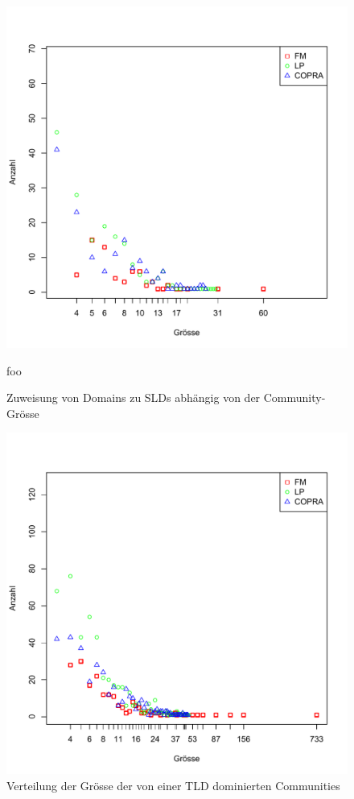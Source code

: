 \begin{figure}[h]
  \centering
  \includegraphics[scale=0.8]{images/sld_sure_dist.pdf}
  \caption{foo}
  \caption{Zuweisung von Domains zu SLDs abh\"angig von der Community-Gr\"osse}
  \label{fig:sld-sure-ass-dist}
\end{figure}

\begin{figure}[h]
  \centering
  \includegraphics[scale=0.8]{images/sld_maybe_dist.pdf}
  \caption{Verteilung der Gr\"osse der von einer TLD dominierten Communities}
  \label{fig:sld-maybe-ass-dist}
\end{figure}

